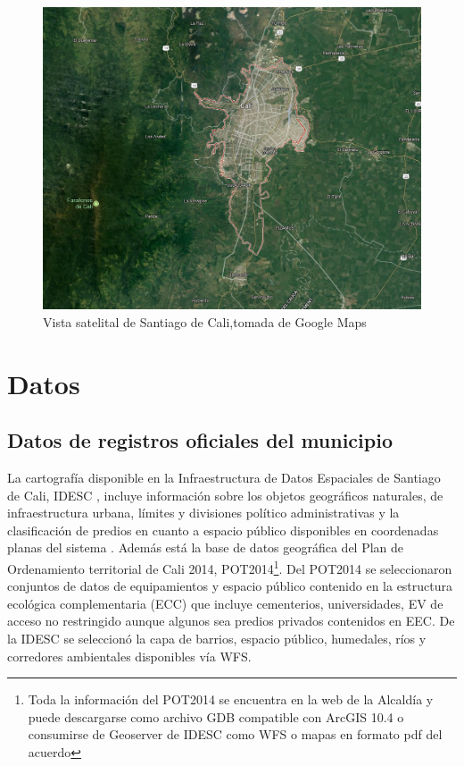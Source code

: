 \documentclass[12pt,]{book}
\let\rmarkdownfootnote\footnote%
\def\footnote{\protect\rmarkdownfootnote}
\begin{document}
\begin{figure}
\includegraphics[width=1\linewidth]{images/satelite} \caption{Vista satelital de Santiago de Cali,tomada de Google Maps}\label{fig:satelite}
\end{figure}

\section{Datos}\label{datos}

\subsection{Datos de registros oficiales del
municipio}\label{datos-de-registros-oficiales-del-municipio}

La cartografía disponible en la Infraestructura de Datos Espaciales de
Santiago de Cali, IDESC \citep{geoportal_idesc}, incluye información
sobre los objetos geográficos naturales, de infraestructura urbana,
límites y divisiones político administrativas y la clasificación de
predios en cuanto a espacio público disponibles en coordenadas planas
del sistema \citep{noauthor_magna-sirgas-cali_nodate}. Además está la
base de datos geográfica del Plan de Ordenamiento territorial de Cali
2014, POT2014\footnote{Toda la información del POT2014 se encuentra en
  la web de la Alcaldía y puede descargarse como archivo GDB compatible
  con ArcGIS 10.4 o consumirse de Geoserver de IDESC como WFS o mapas en
  formato pdf del acuerdo}. Del POT2014 se seleccionaron conjuntos de
datos de equipamientos y espacio público contenido en la estructura
ecológica complementaria (ECC) que incluye cementerios, universidades,
EV de acceso no restringido aunque algunos sea predios privados
contenidos en EEC. De la IDESC se seleccionó la capa de barrios, espacio
público, humedales, ríos y corredores ambientales disponibles vía WFS.
\end{document}
